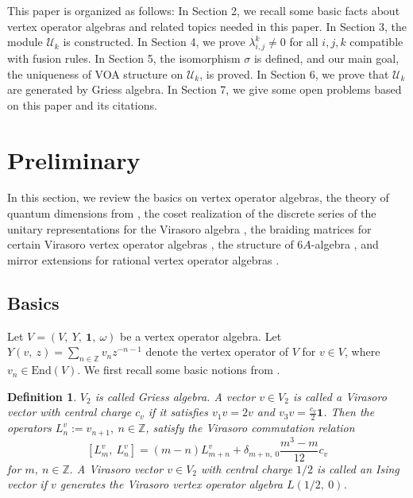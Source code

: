 \documentclass{article}
\newtheorem{definition}[lemma]{Definition}
\begin{document}
	This paper is organized as follows: 
	In Section 2, we recall some basic facts about
	vertex operator algebras and related topics needed in this paper. 
	In Section 3, the module $\mathcal{U}_k$ is constructed.
	In Section 4, we prove $\lambda_{i,j}^k\neq 0$ for all $i,j,k$ compatible with fusion rules.
	In Section 5, the isomorphism $\sigma$ is defined, and our main goal, the uniqueness of VOA structure on $\mathcal{U}_k$, is proved.
	In Section 6, we prove that $\mathcal{U}_k$ are generated by Griess algebra.
	In Section 7, we give some open problems based on this paper and its citations.
	
	\section{Preliminary}
	In this section, we review the basics on vertex operator algebras,
	the theory of quantum dimensions from \cite{DJX}, the coset realization
	of the discrete series of the unitary representations for the Virasoro
	algebra \cite{GKO}, the braiding matrices for certain Virasoro
	vertex operator algebras \cite{FFK}, 
	the structure of $6A$-algebra \cite{DJY},
	and mirror extensions for rational vertex operator algebras \cite{Lin}.
	
	\subsection{Basics}
	Let $V=(V,\ Y,\ \mathbf{1},\ \omega)$ be a vertex operator algebra.
	Let $Y(v,\ z)=\sum_{n\in\mathbb{Z}}v_{n}z^{-n-1}$ denote the vertex
	operator of $V$ for $v\in V$, where $v_{n}\in\mbox{End}(V)$. We
	first recall some basic notions from \cite{FLM,Z,DLM1,DLM3}.
	
	\begin{definition} $V_{2}$ is called \emph{Griess algebra}. A vector $v\in V_{2}$ is called a \emph{Virasoro
			vector with central charge $c_{v}$ }if it satisfies\emph{ $v_{1}v=2v$
		}and $v_{3}v=\frac{c_{v}}{2}\mathbf{1}$. Then the operators $L_{n}^{v}:=v_{n+1},\ n\in\mathbb{Z}$,
		satisfy the Virasoro commutation relation
		\[
		\left[L_{m}^{v},\ L_{n}^{v}\right]=\left(m-n\right)L_{m+n}^{v}+\delta_{m+n,\ 0}\frac{m^{3}-m}{12}c_{v}
		\]
		for $m,\ n\in\mathbb{Z}.$ A Virasoro vector $v\in V_{2}$ with central
		charge $1/2$ is called an \emph{Ising vector }if $v$ generates the
		Virasoro vertex operator algebra $L(1/2,\ 0)$.
		
	\end{definition}
	
\end{document}
